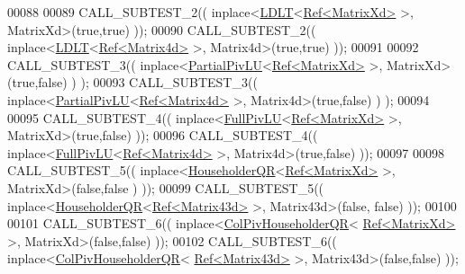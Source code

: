 \begin{DoxyCode}
00088 
00089     CALL\_SUBTEST\_2(( inplace<\hyperlink{group___cholesky___module_class_eigen_1_1_l_d_l_t}{LDLT}<\hyperlink{group___core___module_class_eigen_1_1_ref}{Ref<MatrixXd>} >, MatrixXd>(\textcolor{keyword}{true},\textcolor{keyword}{true}) ));
00090     CALL\_SUBTEST\_2(( inplace<\hyperlink{group___cholesky___module_class_eigen_1_1_l_d_l_t}{LDLT}<\hyperlink{group___core___module_class_eigen_1_1_ref}{Ref<Matrix4d>} >, Matrix4d>(\textcolor{keyword}{true},\textcolor{keyword}{true}) ));
00091 
00092     CALL\_SUBTEST\_3(( inplace<\hyperlink{group___l_u___module_class_eigen_1_1_partial_piv_l_u}{PartialPivLU}<\hyperlink{group___core___module_class_eigen_1_1_ref}{Ref<MatrixXd>} >, MatrixXd>(\textcolor{keyword}{true},\textcolor{keyword}{false}) )
      );
00093     CALL\_SUBTEST\_3(( inplace<\hyperlink{group___l_u___module_class_eigen_1_1_partial_piv_l_u}{PartialPivLU}<\hyperlink{group___core___module_class_eigen_1_1_ref}{Ref<Matrix4d>} >, Matrix4d>(\textcolor{keyword}{true},\textcolor{keyword}{false}) )
      );
00094 
00095     CALL\_SUBTEST\_4(( inplace<\hyperlink{group___l_u___module_class_eigen_1_1_full_piv_l_u}{FullPivLU}<\hyperlink{group___core___module_class_eigen_1_1_ref}{Ref<MatrixXd>} >, MatrixXd>(\textcolor{keyword}{true},\textcolor{keyword}{false}) ));
00096     CALL\_SUBTEST\_4(( inplace<\hyperlink{group___l_u___module_class_eigen_1_1_full_piv_l_u}{FullPivLU}<\hyperlink{group___core___module_class_eigen_1_1_ref}{Ref<Matrix4d>} >, Matrix4d>(\textcolor{keyword}{true},\textcolor{keyword}{false}) ));
00097 
00098     CALL\_SUBTEST\_5(( inplace<\hyperlink{group___q_r___module_class_eigen_1_1_householder_q_r}{HouseholderQR}<\hyperlink{group___core___module_class_eigen_1_1_ref}{Ref<MatrixXd>} >, MatrixXd>(\textcolor{keyword}{false},\textcolor{keyword}{false}
      ) ));
00099     CALL\_SUBTEST\_5(( inplace<\hyperlink{group___q_r___module_class_eigen_1_1_householder_q_r}{HouseholderQR}<\hyperlink{group___core___module_class_eigen_1_1_ref}{Ref<Matrix43d>} >, Matrix43d>(\textcolor{keyword}{false},\textcolor{keyword}{
      false}) ));
00100 
00101     CALL\_SUBTEST\_6(( inplace<\hyperlink{group___q_r___module_class_eigen_1_1_col_piv_householder_q_r}{ColPivHouseholderQR}<
      \hyperlink{group___core___module_class_eigen_1_1_ref}{Ref<MatrixXd>} >, MatrixXd>(\textcolor{keyword}{false},\textcolor{keyword}{false}) ));
00102     CALL\_SUBTEST\_6(( inplace<\hyperlink{group___q_r___module_class_eigen_1_1_col_piv_householder_q_r}{ColPivHouseholderQR}<
      \hyperlink{group___core___module_class_eigen_1_1_ref}{Ref<Matrix43d>} >, Matrix43d>(\textcolor{keyword}{false},\textcolor{keyword}{false}) ));

\end{DoxyCode}
